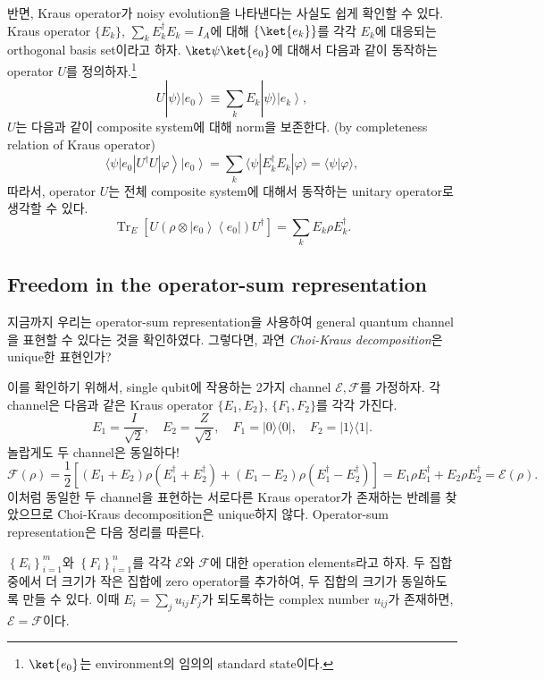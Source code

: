 반면, Kraus operator가 noisy evolution을 나타낸다는 사실도 쉽게 확인할 수 있다. Kraus operator $\{E_k\}$, $\sum_k E_k^\dagger E_k = I_A$에 대해 $\{\ket{e_k}\}$를 각각 $E_k$에 대응되는 orthogonal basis set이라고 하자. 
$\ket \psi \ket{e_0}$에 대해서 다음과 같이 동작하는 operator $U$를 정의하자.\footnote{$\ket{e_0}$는 environment의 임의의 standard state이다.}
\begin{equation*}
    U|\psi\rangle\left|e_0\right\rangle \equiv \sum_k E_k|\psi\rangle\left|e_k\right\rangle,
\end{equation*}
$U$는 다음과 같이 composite system에 대해 norm을 보존한다. (by completeness relation of Kraus operator)
\begin{equation*}
    \left.\langle\psi| e_0\left|U^{\dagger} U\right| \varphi\right\rangle\left|e_0\right\rangle=\sum_k\langle\psi| E_k^{\dagger} E_k|\varphi\rangle=\langle\psi | \varphi\rangle,
\end{equation*}
따라서, operator $U$는 전체 composite system에 대해서 동작하는 unitary operator로 생각할 수 있다.
\begin{equation*}
    \operatorname{Tr}_E\left[U\left(\rho \otimes\left|e_0\right\rangle\left\langle e_0\right|\right) U^{\dagger}\right]=\sum_k E_k \rho E_k^{\dagger} .
\end{equation*}

\subsection{Freedom in the operator-sum representation}
지금까지 우리는 operator-sum representation을 사용하여 general quantum channel을 표현할 수 있다는 것을 확인하였다. 그렇다면, 과연 \textit{Choi-Kraus decomposition}은 unique한 표현인가?

이를 확인하기 위해서, single qubit에 작용하는 2가지 channel $\mathcal E, \mathcal F$를 가정하자. 각 channel은 다음과 같은 Kraus operator $\{E_1, E_2\}$, $\{F_1, F_2\}$를 각각 가진다.
\begin{equation*}
    E_1=\frac{I}{\sqrt{2}}, \quad E_2=\frac{Z}{\sqrt{2}}, \quad F_1=|0\rangle\langle 0|, \quad F_2=|1\rangle\langle 1| .
\end{equation*}
놀랍게도 두 channel은 동일하다!
\begin{equation*}
    \mathcal{F}(\rho)=\frac{1}{2}\left[(E_1+E_2) \rho(E_1^{\dagger}+E_2^{\dagger})+(E_1-E_2) \rho(E_1^{\dagger}-E_2^{\dagger})\right ]= E_1 \rho E_1^{\dagger}+E_2 \rho E_2^{\dagger}=\mathcal{E}(\rho) .
\end{equation*}
이처럼 동일한 두 channel을 표현하는 서로다른 Kraus operator가 존재하는 반례를 찾았으므로 Choi-Kraus decomposition은 unique하지 않다. Operator-sum representation은 다음 정리를 따른다.
\begin{theorem}
    $\left\{E_i\right\}_{i=1}^m$와 $\left\{F_i\right\}_{i=1}^n$를 각각 $\mathcal{E}$와 $\mathcal{F}$에 대한 operation elements라고 하자. 두 집합 중에서 더 크기가 작은 집합에 zero operator를 추가하여, 두 집합의 크기가 동일하도록 만들 수 있다. 이때 $E_i = \sum_j u_{i j} F_j$가 되도록하는 complex number $u_{ij}$가 존재하면, $\mathcal{E}=\mathcal{F}$이다.
\end{theorem}


